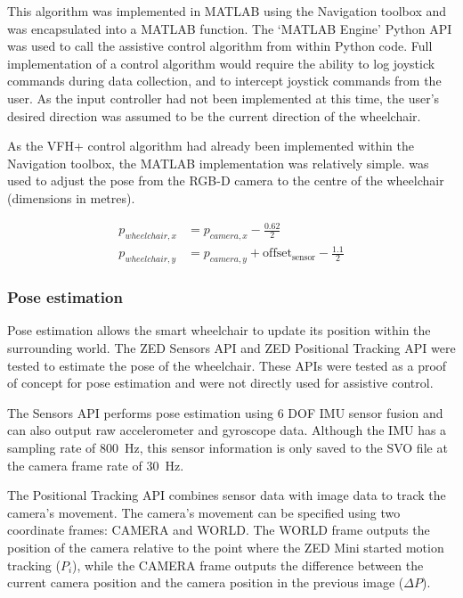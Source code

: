 This algorithm was implemented in MATLAB using the Navigation toolbox and was encapsulated into a MATLAB function.
The `MATLAB Engine' Python API was used to call the assistive control algorithm from within Python code.
Full implementation of a control algorithm would require the ability to log joystick commands during
data collection, and to intercept joystick commands from the user. As the input controller had not
been implemented at this time, the user's desired direction was assumed to be the current direction
of the wheelchair.

As the VFH+ control algorithm had already been implemented within the Navigation toolbox,
the MATLAB implementation was relatively simple.  was used to adjust
the pose from the RGB-D camera to the centre of the wheelchair (dimensions in metres).

\begin{equation}
\begin{split}
p_{wheelchair,x} &= p_{camera,x} - \frac{0.62}{2}\\
p_{wheelchair,y} &= p_{camera,y} + \mathrm{offset_{sensor}} - \frac{1.1}{2}
\end{split}
\label{eq:pose_adjustment}
\end{equation}

\subsubsection{Pose estimation}
Pose estimation allows the smart wheelchair to update its position within the surrounding world.
The ZED Sensors API and ZED Positional Tracking API were tested to estimate the pose of the wheelchair.
These APIs were tested as a proof of concept for pose estimation and were not directly used
for assistive control.

\pagebreak
The Sensors API performs pose estimation using 6 DOF IMU sensor fusion and can also output raw accelerometer
and gyroscope data. Although the IMU has a sampling rate of \SI{800}{\hertz}, this sensor information
is only saved to the SVO file at the camera frame rate of \SI{30}{\hertz}.

The Positional Tracking API combines sensor data with image data to track the camera's movement.
The camera's movement can be specified using two coordinate frames: CAMERA and WORLD.
The WORLD frame outputs the position of the camera relative to the point where the ZED Mini started
motion tracking ($P_i$), while the CAMERA frame outputs the difference between the current camera position and
the camera position in the previous image ($\Delta P$).

